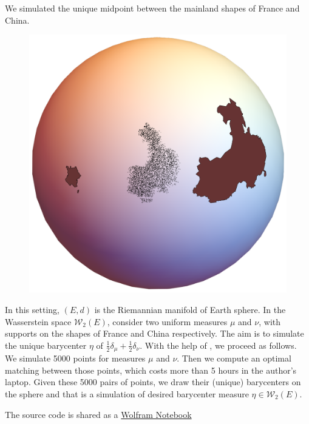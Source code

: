 We simulated the unique midpoint between the mainland shapes of France and China.
\begin{figure}
	\includegraphics[width=\linewidth]{Chapters/OPT_sphere.pdf}
\end{figure}

\begin{example}
	\label{example:barycenter_sphere}
	In this setting, $(E, d)$ is the Riemannian manifold of Earth sphere.
	In the Wasserstein space $\mathcal{W}_2(E)$, consider two uniform measures $\mu$ and $\nu$,
	with supports on the shapes of France and China respectively.
	The aim is to simulate the unique barycenter $\eta$ of $\frac{1}{2}\delta_\mu + \frac{1}{2}\delta_\nu$.
	With the help of , we proceed as follows.
	We simulate 5000 points for measures $\mu$ and $\nu$.
	Then we compute an optimal matching between those points,
	which costs more than 5 hours in the author's laptop.
	Given these 5000 pairs of points,
	we draw their (unique) barycenters on the sphere and that is a simulation of desired barycenter measure $\eta \in \mathcal{W}_2(E)$.
\end{example}

The source code is shared as a \href{https://www.wolframcloud.com/obj/jingmatrix/Published/OPT_sphere_country.nb}{Wolfram Notebook}
